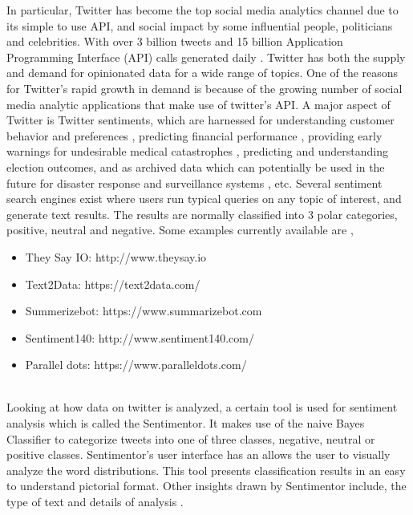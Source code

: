 In particular, Twitter has become the top social media analytics channel due to its simple to use API, and social impact by some influential people, politicians and celebrities. With over 3 billion tweets and 15 billion Application Programming Interface (API) calls generated daily \cite{ref8}. Twitter has both the supply and demand for opinionated data for a wide range of topics. One of the reasons for Twitter's rapid growth in demand is because of the growing number of social media analytic applications  that make use of twitter's API. A major aspect of Twitter is Twitter sentiments, which are harnessed for understanding customer behavior and preferences \cite{ref11}, predicting financial performance \cite{ref9}, providing early warnings for undesirable medical catastrophes \cite{ref10}, predicting and understanding election outcomes, and as archived data which can potentially be used in the future for disaster response and surveillance systems \cite{ref13}, etc. Several sentiment search engines exist where users run typical queries on any topic of interest, and generate text results. The results are normally classified into 3 polar categories, positive, neutral and negative. Some examples currently available are \cite{ref14},

\begin{itemize}

\item They Say IO:  http://www.theysay.io
\item Text2Data:  https://text2data.com/
\item Summerizebot:  https://www.summarizebot.com
\item Sentiment140: http://www.sentiment140.com/
\item Parallel dots: https://www.paralleldots.com/

\end{itemize}
\leavevmode\\
Looking at how data on twitter is analyzed, a certain tool is used for sentiment analysis which is called the Sentimentor. It makes use of the naive Bayes Classifier to categorize tweets into one of three classes, negative, neutral or positive classes. Sentimentor's user interface has an allows the user to visually analyze the word distributions. This tool presents classification results in an easy to understand pictorial format. Other insights drawn by Sentimentor include, the type of text and details of analysis \cite{ref15}.

